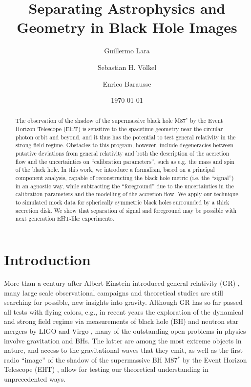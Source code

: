 \documentclass[%
nofootinbib,
 amsmath,amssymb,
 aps,
floatfix,
twocolumn
]{revtex4-2}
\begin{document}
\title{Separating Astrophysics and Geometry in Black Hole Images}

\author{Guillermo Lara}
\author{Sebastian H. V\"olkel}
\author{Enrico Barausse}


\date{\today}

\begin{abstract}
The observation of the shadow of the supermassive black hole M87$^*$ by the Event Horizon Telescope (EHT) is sensitive to the spacetime geometry near the circular photon orbit and beyond, and it thus has the potential to test general relativity in the strong field regime. Obstacles to this program, however, include degeneracies between putative deviations from general relativity and
both the description of the accretion flow
and the uncertainties on 
``calibration parameters'', such as e.g. the 
mass and spin of the black hole.
In this work, we introduce a formalism, based on a principal component analysis, capable of reconstructing the black hole metric (i.e. the ``signal'') in an agnostic way, while subtracting the ``foreground'' due to the uncertainties in the calibration parameters and the modelling of the accretion flow. We apply our technique to simulated mock data for spherically symmetric black holes surrounded by a thick accretion disk. We show that separation of signal and foreground may be possible with next generation EHT-like experiments.
\end{abstract}

\maketitle  

\section{Introduction}\label{introduction}

More than a century after Albert Einstein introduced general relativity (GR) \cite{Einstein:1916vd}, many large scale observational campaigns and theoretical studies are still searching for possible, new insights into gravity. Although GR has so far passed all tests with flying colors, e.g., in recent years the exploration of the dynamical and strong field regime via measurements of black hole (BH) and neutron star mergers  by LIGO and Virgo \cite{PhysRevLett.116.061102,PhysRevLett.119.161101,PhysRevLett.116.221101,Abbott:2020jks}, many of the outstanding open problems in physics involve gravitation and BHs. The latter are among the most extreme objects in nature, and  access to the gravitational waves that they emit, as well as the first radio ``image'' of the shadow of the supermassive BH M87$^*$ by the Event Horizon Telescope (EHT) \cite{eht,Akiyama:2019eap}, allow for testing our theoretical understanding in unprecedented ways. 
\end{document}
